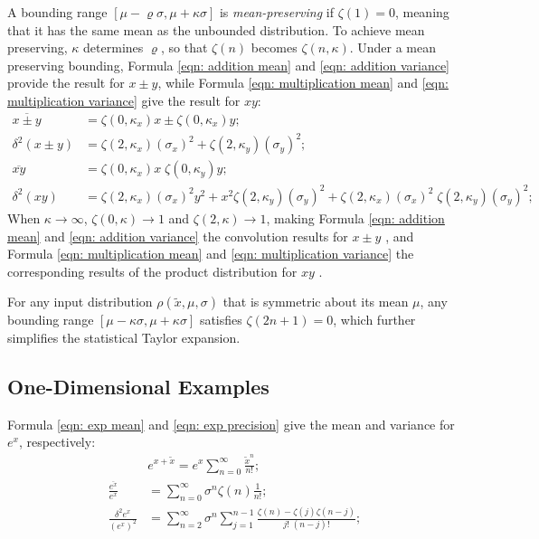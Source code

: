\documentclass[twoside]{article}
\numberwithin{equation}{section}
\begin{document}
A bounding range $[\mu - \varrho \sigma, \mu + \kappa \sigma]$ is \emph{mean-preserving} if $\zeta(1) = 0$, meaning that it has the same mean as the unbounded distribution.
To achieve mean preserving, $\kappa$ determines $\varrho$, so that $\zeta(n)$ becomes $\zeta(n, \kappa)$.
Under a mean preserving bounding, Formula \eqref{eqn: addition mean} and \eqref{eqn: addition variance} provide the result for $x \pm y$, while Formula \eqref{eqn: multiplication mean} and \eqref{eqn: multiplication variance} give the result for $x y$:
\begin{align}
\label{eqn: addition mean}
\overline{x \pm y} &= \zeta(0, \kappa_x) x \pm \zeta(0, \kappa_x) y; \\
\label{eqn: addition variance}
\delta^2 (x \pm y) &= \zeta(2, \kappa_x) (\sigma_x)^2 + \zeta(2, \kappa_y) (\sigma_y)^2; \\
\label{eqn: multiplication mean}
\overline{x y} &= \zeta(0, \kappa_x) x \; \zeta(0, \kappa_y) y; \\
\label{eqn: multiplication variance}
\delta^2 (x y) &= \zeta(2, \kappa_x) (\sigma_x)^2 y^2 + x^2 \zeta(2, \kappa_y) (\sigma_y)^2 + \zeta(2, \kappa_x) (\sigma_x)^2 \; \zeta(2, \kappa_y) (\sigma_y)^2;
\end{align}
When $\kappa \rightarrow \infty$, $\zeta(0, \kappa) \rightarrow 1$ and $\zeta(2, \kappa) \rightarrow 1$, making Formula \eqref{eqn: addition mean} and \eqref{eqn: addition variance} the convolution results for $x \pm y$ \cite{Probability_Statistics}, and Formula \eqref{eqn: multiplication mean} and \eqref{eqn: multiplication variance} the corresponding results of the product distribution for $x y$ \cite{Probability_Statistics}.

For any input distribution $\rho(\tilde{x}, \mu, \sigma)$ that is symmetric about its mean $\mu$, any bounding range $[\mu - \kappa \sigma, \mu + \kappa \sigma]$ satisfies $\zeta(2n+1) = 0$, which further simplifies the statistical Taylor expansion.




\subsection{One-Dimensional Examples}

Formula \eqref{eqn: exp mean} and \eqref{eqn: exp precision} give the mean and variance for $e^x$, respectively:
\begin{align}
\label{eqn: exp Taylor}
& e^{x + \tilde{x}} = e^x \sum_{n=0}^{\infty} \frac{\tilde{x}^n}{n!}; \\
\label{eqn: exp mean}
\frac{\overline{e^x}}{e^x}  &= \sum_{n=0}^{\infty} \sigma^n \zeta(n) \frac{1}{n!}; \\
\label{eqn: exp precision}
\frac{\delta^2 e^x}{(e^x)^2} &= \sum_{n=2}^{\infty} \sigma^n \sum_{j=1}^{n-1} \frac{\zeta(n) - \zeta(j) \zeta(n - j)}{j!\;(n - j)!};
\end{align}
\end{document}
